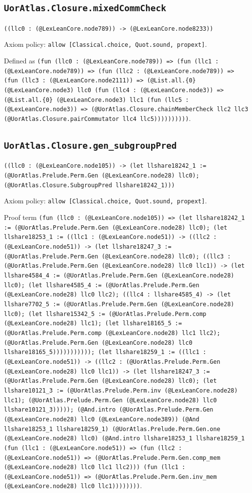 \documentclass[11pt]{article}
\begin{document}
\subsection*{\texttt{UorAtlas.Closure.mixedCommCheck}}
\noindent\texttt{((llc0 : (@LexLeanCore.node789)) -> (@LexLeanCore.node8233))}\par
\noindent Axiom policy: \texttt{allow [Classical.choice, Quot.sound, propext]}.\par
\noindent Defined as \texttt{(fun (llc0 : (@LexLeanCore.node789)) => (fun (llc1 : (@LexLeanCore.node789)) => (fun (llc2 : (@LexLeanCore.node789)) => (fun (llc3 : (@LexLeanCore.node2111)) => (@List.all.\{0\} (@LexLeanCore.node3) llc0 (fun (llc4 : (@LexLeanCore.node3)) => (@List.all.\{0\} (@LexLeanCore.node3) llc1 (fun (llc5 : (@LexLeanCore.node3)) => (@UorAtlas.Closure.chainMemberCheck llc2 llc3 (@UorAtlas.Closure.pairCommutator llc4 llc5))))))))))}.\par
\subsection*{\texttt{UorAtlas.Closure.gen\_subgroupPred}}
\noindent\texttt{((llc0 : (@LexLeanCore.node105)) -> (let llshare18242\_1 := (@UorAtlas.Prelude.Perm.Gen (@LexLeanCore.node28) llc0); (@UorAtlas.Closure.SubgroupPred llshare18242\_1)))}\par
\noindent Axiom policy: \texttt{allow [Classical.choice, Quot.sound, propext]}.\par
\noindent Proof term \texttt{(fun (llc0 : (@LexLeanCore.node105)) => (let llshare18242\_1 := (@UorAtlas.Prelude.Perm.Gen (@LexLeanCore.node28) llc0); (let llshare18253\_1 := ((llc1 : (@LexLeanCore.node51)) -> ((llc2 : (@LexLeanCore.node51)) -> (let llshare18247\_3 := (@UorAtlas.Prelude.Perm.Gen (@LexLeanCore.node28) llc0); ((llc3 : (@UorAtlas.Prelude.Perm.Gen (@LexLeanCore.node28) llc0 llc1)) -> (let llshare4584\_4 := (@UorAtlas.Prelude.Perm.Gen (@LexLeanCore.node28) llc0); (let llshare4585\_4 := (@UorAtlas.Prelude.Perm.Gen (@LexLeanCore.node28) llc0 llc2); ((llc4 : llshare4585\_4) -> (let llshare7702\_5 := (@UorAtlas.Prelude.Perm.Gen (@LexLeanCore.node28) llc0); (let llshare15342\_5 := (@UorAtlas.Prelude.Perm.comp (@LexLeanCore.node28) llc1); (let llshare18165\_5 := (@UorAtlas.Prelude.Perm.comp (@LexLeanCore.node28) llc1 llc2); (@UorAtlas.Prelude.Perm.Gen (@LexLeanCore.node28) llc0 llshare18165\_5))))))))))); (let llshare18259\_1 := ((llc1 : (@LexLeanCore.node51)) -> ((llc2 : (@UorAtlas.Prelude.Perm.Gen (@LexLeanCore.node28) llc0 llc1)) -> (let llshare18247\_3 := (@UorAtlas.Prelude.Perm.Gen (@LexLeanCore.node28) llc0); (let llshare10121\_3 := (@UorAtlas.Prelude.Perm.inv (@LexLeanCore.node28) llc1); (@UorAtlas.Prelude.Perm.Gen (@LexLeanCore.node28) llc0 llshare10121\_3))))); (@And.intro (@UorAtlas.Prelude.Perm.Gen (@LexLeanCore.node28) llc0 (@LexLeanCore.node389)) (@And llshare18253\_1 llshare18259\_1) (@UorAtlas.Prelude.Perm.Gen.one (@LexLeanCore.node28) llc0) (@And.intro llshare18253\_1 llshare18259\_1 (fun (llc1 : (@LexLeanCore.node51)) => (fun (llc2 : (@LexLeanCore.node51)) => (@UorAtlas.Prelude.Perm.Gen.comp\_mem (@LexLeanCore.node28) llc0 llc1 llc2))) (fun (llc1 : (@LexLeanCore.node51)) => (@UorAtlas.Prelude.Perm.Gen.inv\_mem (@LexLeanCore.node28) llc0 llc1))))))))}.\par
\end{document}
